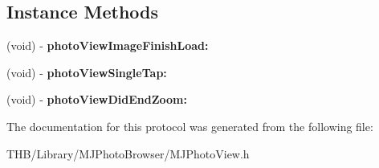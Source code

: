 \subsection*{Instance Methods}
\begin{DoxyCompactItemize}
\item 
\mbox{\label{protocol_m_j_photo_view_delegate_01-p_a196fbb09f8c90b1b1b6291b5fac055cf}} 
(void) -\/ {\bfseries photo\+View\+Image\+Finish\+Load\+:}
\item 
\mbox{\label{protocol_m_j_photo_view_delegate_01-p_a317b650fd3bb5ffc6acc004b5919bfc0}} 
(void) -\/ {\bfseries photo\+View\+Single\+Tap\+:}
\item 
\mbox{\label{protocol_m_j_photo_view_delegate_01-p_a4ba391dfd45456a7081e88199b4e46b8}} 
(void) -\/ {\bfseries photo\+View\+Did\+End\+Zoom\+:}
\end{DoxyCompactItemize}


The documentation for this protocol was generated from the following file\+:\begin{DoxyCompactItemize}
\item 
T\+H\+B/\+Library/\+M\+J\+Photo\+Browser/M\+J\+Photo\+View.\+h\end{DoxyCompactItemize}
